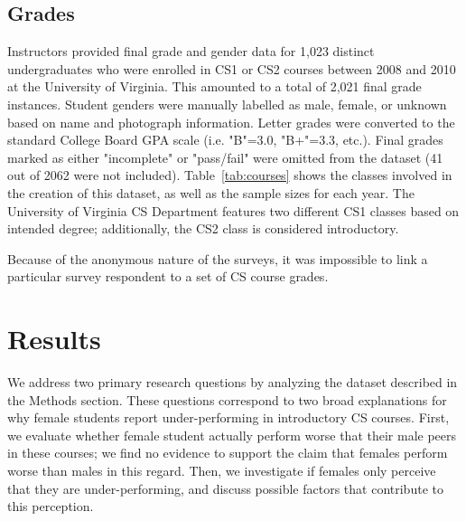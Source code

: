 \documentclass[a4paper,man,natbib]{apa6}
\begin{document}
\subsection{Grades}
\label{sec:grade}
Instructors provided final grade and gender data for 1,023 distinct
undergraduates who were enrolled in CS1 or CS2 courses between 2008 and 2010 at
the University of Virginia. This amounted to a total of 2,021 final grade
instances. Student genders were manually labelled as male, female, or unknown
based on name and photograph information. Letter grades were converted to the
standard College Board GPA scale (i.e. "B"=3.0, "B+"=3.3, etc.). Final grades
marked as either "incomplete" or "pass/fail" were omitted from the dataset (41
out of 2062 were not included). Table~\ref{tab:courses} shows the classes involved in
the creation of this dataset, as well as the sample sizes for each year. The
University of Virginia CS Department features two different CS1 classes based
on intended degree; additionally, the CS2 class is considered introductory. 

Because of the anonymous nature of the surveys, it was impossible to link a
particular survey respondent to a set of CS course grades.

\section{Results}
\label{sec:results}
We address two primary research questions by analyzing the dataset described in
the Methods section. These questions correspond to two broad explanations for
why female students report under-performing in introductory CS courses. First,
we evaluate whether female student actually perform worse that their male peers
in these courses; we find no evidence to support the claim that females perform
worse than males in this regard. Then, we investigate if females only perceive
that they are under-performing, and discuss possible factors that contribute to
this perception. 
\end{document}
